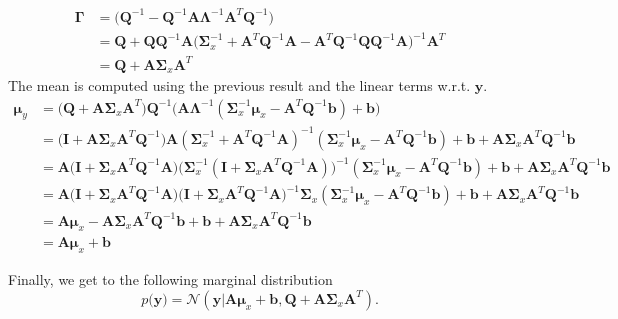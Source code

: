\begin{enumerate}
\begin{align*}
    \bm{\Gamma} &= \Big(\textbf{Q}^{-1} - \textbf{Q}^{-1}\textbf{A}\bm{\Lambda}^{-1}\textbf{A}^T\textbf{Q}^{-1}\Big) \\
    &= \textbf{Q} +  \textbf{Q}\textbf{Q}^{-1}\textbf{A}\Big(\bm{\Sigma}_x^{-1} + \textbf{A}^T\textbf{Q}^{-1}\textbf{A} - \textbf{A}^T\textbf{Q}^{-1}\textbf{Q}\textbf{Q}^{-1}\textbf{A}\Big)^{-1}\textbf{A}^T\\
    &= \textbf{Q} + \textbf{A}\bm{\Sigma}_x\textbf{A}^T
\end{align*}
The mean is computed using the previous result and the linear terms w.r.t. $\textbf{y}$.
\begin{align*}
    \bm{\mu}_{y} &= \Big(\textbf{Q} + \textbf{A}\bm{\Sigma}_x\textbf{A}^T\Big)\textbf{Q}^{-1}\Big(\textbf{A}\bm{\Lambda}^{-1}(\bm{\Sigma}_x^{-1}\bm{\mu}_x - \textbf{A}^T\textbf{Q}^{-1}\textbf{b} )+ \textbf{b} \Big)\\
    &= \Big(\textbf{I} + \textbf{A}\bm{\Sigma}_x\textbf{A}^T\textbf{Q}^{-1}\Big)\textbf{A}(\bm{\Sigma}_x^{-1} + \textbf{A}^T\textbf{Q}^{-1}\textbf{A})^{-1}(\bm{\Sigma}_x^{-1}\bm{\mu}_x - \textbf{A}^T\textbf{Q}^{-1}\textbf{b}) + \textbf{b} + \textbf{A}\bm{\Sigma}_x \textbf{A}^T \textbf{Q}^{-1}\textbf{b}\\
    &= \textbf{A}\Big(\textbf{I} + \bm{\Sigma}_x\textbf{A}^T\textbf{Q}^{-1}\textbf{A}\Big)\Big(\bm{\Sigma}_x^{-1}(\textbf{I} + \bm{\Sigma}_x\textbf{A}^T\textbf{Q}^{-1}\textbf{A})\Big)^{-1}(\bm{\Sigma}_x^{-1}\bm{\mu}_x - \textbf{A}^T\textbf{Q}^{-1}\textbf{b})+ \textbf{b} + \textbf{A}\bm{\Sigma}_x \textbf{A}^T \textbf{Q}^{-1}\textbf{b}\\
    &= \textbf{A}\Big(\textbf{I} + \bm{\Sigma}_x\textbf{A}^T\textbf{Q}^{-1}\textbf{A}\Big)\Big(\textbf{I} + \bm{\Sigma}_x\textbf{A}^T\textbf{Q}^{-1}\textbf{A}\Big)^{-1}\bm{\Sigma}_x(\bm{\Sigma}_x^{-1}\bm{\mu}_x - \textbf{A}^T\textbf{Q}^{-1}\textbf{b})+ \textbf{b} + \textbf{A}\bm{\Sigma}_x \textbf{A}^T \textbf{Q}^{-1}\textbf{b}\\
    &= \textbf{A}\bm{\mu}_x - \textbf{A}\bm{\Sigma}_x\textbf{A}^T\textbf{Q}^{-1}\textbf{b} + \textbf{b} + \textbf{A}\bm{\Sigma}_x\textbf{A}^T\textbf{Q}^{-1}\textbf{b}\\
    &= \textbf{A}\bm{\mu}_x + \textbf{b}
\end{align*}

Finally, we get to the following marginal distribution
\begin{equation}
p(\textbf{y)} = \mathcal{N}(\textbf{y} | \textbf{A}\bm{\mu}_x + \textbf{b},  \textbf{Q} + \textbf{A}\bm{\Sigma}_x\textbf{A}^T).
\end{equation}


\end{enumerate}
